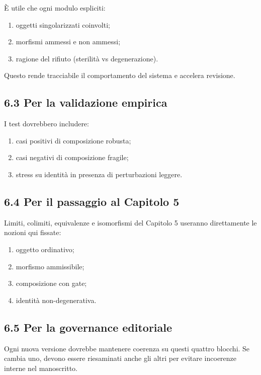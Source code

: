 È utile che ogni modulo espliciti:

\begin{enumerate}
\def\labelenumi{\arabic{enumi}.}
\tightlist
\item
  oggetti singolarizzati coinvolti;
\item
  morfismi ammessi e non ammessi;
\item
  ragione del rifiuto (sterilità vs degenerazione).
\end{enumerate}

Questo rende tracciabile il comportamento del sistema e accelera revisione.

\subsection{6.3 Per la validazione empirica}

I test dovrebbero includere:

\begin{enumerate}
\def\labelenumi{\arabic{enumi}.}
\tightlist
\item
  casi positivi di composizione robusta;
\item
  casi negativi di composizione fragile;
\item
  stress su identità in presenza di perturbazioni leggere.
\end{enumerate}

\subsection{6.4 Per il passaggio al Capitolo 5}

Limiti, colimiti, equivalenze e isomorfismi del Capitolo 5 useranno direttamente le nozioni qui fissate:

\begin{enumerate}
\def\labelenumi{\arabic{enumi}.}
\tightlist
\item
  oggetto ordinativo;
\item
  morfismo ammissibile;
\item
  composizione con gate;
\item
  identità non-degenerativa.
\end{enumerate}

\subsection{6.5 Per la governance editoriale}

Ogni nuova versione dovrebbe mantenere coerenza su questi quattro blocchi. Se cambia uno, devono essere riesaminati anche gli altri per evitare incoerenze interne nel manoscritto.


